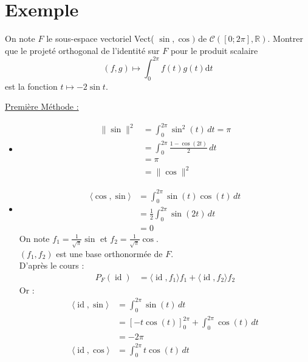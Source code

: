 \documentclass[../main.tex]{subfiles}
\begin{document}
\section{Exemple}
\begin{tcolorbox}[title=Exemple 34.49, title filled=false, colframe=darkgreen, colback=darkgreen!10!white]
    On note $F$ le sous-espace vectoriel Vect( $\sin , \cos )$ de $\mathcal{C}([0 ; 2 \pi], \mathbb{R})$. Montrer que le projeté orthogonal de l'identité sur $F$ pour le produit scalaire
    $$(f, g) \mapsto \int_0^{2 \pi} f(t) g(t) \mathrm{d} t$$
est la fonction $t \mapsto-2 \sin t$.
\end{tcolorbox}

\noindent \underline{Première Méthode :} \\
\begin{itemize}
    \item\begin{align*}
        \|\sin\|^2 &= \int_{0}^{2\pi} \sin^2(t) \,dt = \pi \\
        &= \int_{0}^{2\pi} \frac{1 - \cos(2t)}{2} \,dt \\
        &= \pi \\
        &= \|\cos\|^2 
    \end{align*}
    \item \begin{align*}
        \langle \cos, \sin\rangle &= \int_{0}^{2\pi} \sin(t)\cos(t) \,dt \\
        &= \frac{1}{2} \int_{0}^{2\pi} \sin(2t) \,dt \\
        &= 0
    \end{align*}
    On note $f_1 = \frac{1}{\sqrt{\pi}}\sin$ et $f_2 = \frac{1}{\sqrt{\pi}}\cos$. \\
    $(f_1, f_2)$ est une base orthonormée de $F$. \\
    D'après le cours : 
    \begin{align*}
        P_F(\operatorname{id}) &= \langle \operatorname{id}, f_1 \rangle f_1 + \langle \operatorname{id}, f_2\rangle f_2
    \end{align*}
    Or :
    \begin{align*}
        \langle \operatorname{id}, \sin\rangle &= \int_{0}^{2\pi} \sin(t) \,dt \\
        &= \left[ -t\cos(t) \right]_0^{2\pi} + \int_0^{2\pi} \cos(t) \,dt \\
        &= -2\pi \\
        \langle \operatorname{id}, \cos\rangle &= \int_{0}^{2\pi} t\cos(t) \,dt \\

\end{align*}
\end{itemize}
\end{document}

